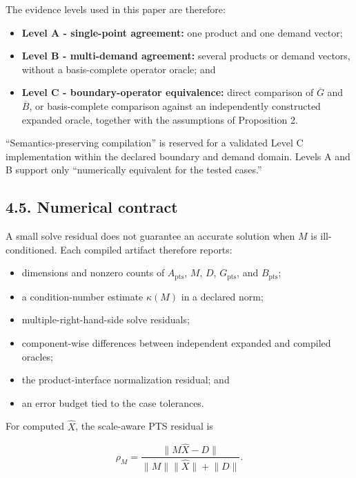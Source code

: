 \documentclass[
  10pt,
  a4paper,
  DIV=11,
  numbers=noendperiod]{scrartcl}
\providecommand{\tightlist}{%
  \setlength{\itemsep}{0pt}\setlength{\parskip}{0pt}}
\begin{document}
The evidence levels used in this paper are therefore:

\begin{itemize}
\tightlist
\item
  \textbf{Level A - single-point agreement:} one product and one demand
  vector;
\item
  \textbf{Level B - multi-demand agreement:} several products or demand
  vectors, without a basis-complete operator oracle; and
\item
  \textbf{Level C - boundary-operator equivalence:} direct comparison of
  \(\overline G\) and \(\overline B\), or basis-complete comparison
  against an independently constructed expanded oracle, together with
  the assumptions of Proposition 2.
\end{itemize}

``Semantics-preserving compilation'' is reserved for a validated Level C
implementation within the declared boundary and demand domain. Levels A
and B support only ``numerically equivalent for the tested cases.''

\newpage

\subsection{4.5. Numerical contract}\label{numerical-contract}

A small solve residual does not guarantee an accurate solution when
\(M\) is ill-conditioned. Each compiled artifact therefore reports:

\begin{itemize}
\tightlist
\item
  dimensions and nonzero counts of \(A_{\mathrm{pts}}\), \(M\), \(D\),
  \(G_{\mathrm{pts}}\), and \(B_{\mathrm{pts}}\);
\item
  a condition-number estimate \(\kappa(M)\) in a declared norm;
\item
  multiple-right-hand-side solve residuals;
\item
  component-wise differences between independent expanded and compiled
  oracles;
\item
  the product-interface normalization residual; and
\item
  an error budget tied to the case tolerances.
\end{itemize}

For computed \(\widehat X\), the scale-aware PTS residual is

\[
\rho_M=
\frac{\lVert M\widehat X-D\rVert}
{\lVert M\rVert\lVert\widehat X\rVert+\lVert D\rVert}.
\tag{16}
\]
\end{document}
